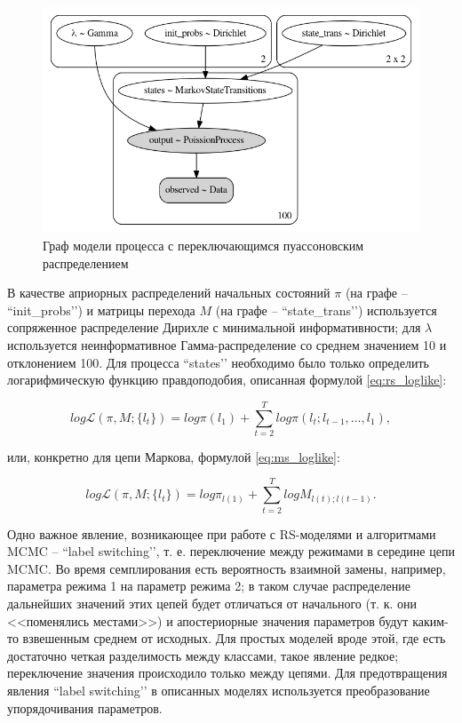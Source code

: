 \documentclass[a4paper,14pt]{extreport}
\begin{document}
\begin{figure}[H]
	\includegraphics[width=\linewidth]{img/gen/pp_ms_pois_graph.png}
	\caption{Граф модели процесса с переключающимся пуассоновским распределением}
	\label{fig:pp_ms_pois_graph}
\end{figure}

В качестве априорных распределений начальных состояний $\pi$ (на графе -- ``init\_probs’’) и матрицы перехода $M$ (на графе -- ``state\_trans’’) используется сопряженное распределение Дирихле с минимальной информативности; для $\lambda$ используется неинформативное Гамма-распределение со среднем значением 10 и отклонением 100. Для процесса ``states’’ необходимо было только определить логарифмическую функцию правдоподобия, описанная формулой \ref{eq:rs_loglike}:

\begin{equation}
	\mathit{log}\mathcal{L}(\pi, M; \{l_t\})
	=
	\mathit{log}\pi(l_1) + 
	\sum\limits_{t=2}^{T}{ 
	\mathit{log}\pi(l_t; l_{t-1}, \dots, l_1)
	} ,
	\label{eq:rs_loglike}
\end{equation}

\noindent
или, конкретно для цепи Маркова, формулой \ref{eq:ms_loglike}:

\begin{equation}
	\mathit{log}\mathcal{L}(\pi, M; \{l_t\})
	=
	\mathit{log} \pi_{l(1)} + 
	\sum\limits_{t=2}^{T}{ 
	\mathit{log} M_{l(t); l(t-1)}
	} .
	\label{eq:ms_loglike}
\end{equation}

Одно важное явление, возникающее при работе с RS-моделями и алгоритмами MCMC – ``label switching’’, т. е. переключение между режимами в середине цепи MCMC. Во время семплирования есть вероятность взаимной замены, например, параметра режима 1 на параметр режима 2; в таком случае распределение дальнейших значений этих цепей будет отличаться от начального (т. к. они <<поменялись местами>>) и апостериорные значения параметров будут каким-то взвешенным среднем от исходных. Для простых моделей вроде этой, где есть достаточно четкая разделимость между классами, такое явление редкое; переключение значения происходило только между цепями. Для предотвращения явления ``label switching’’ в описанных моделях используется преобразование упорядочивания параметров.
\end{document}
